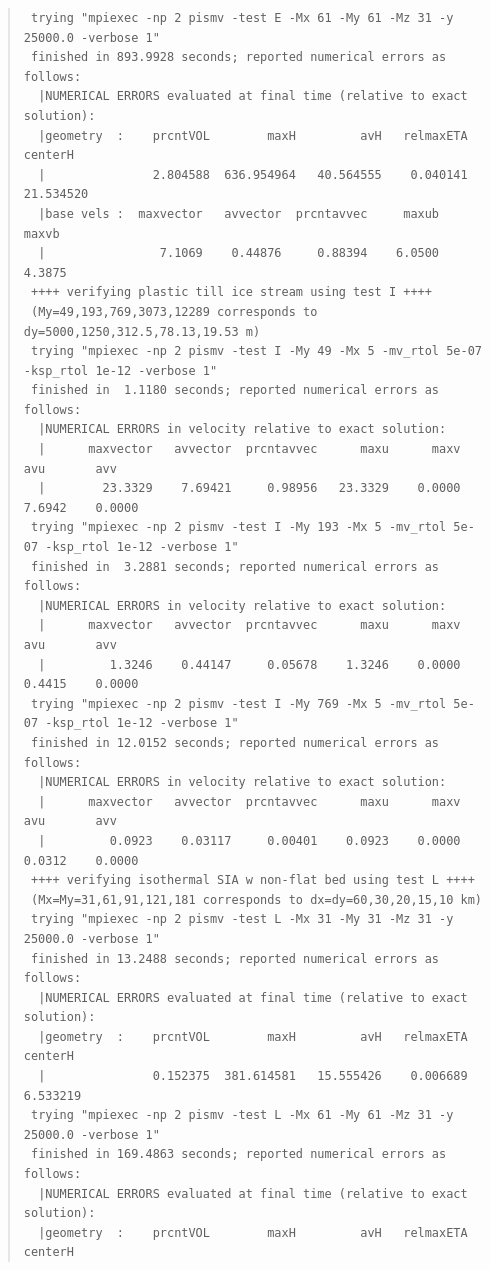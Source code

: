 \documentclass[11pt,final]{amsart}
\begin{document}
\begin{quote}
\begin{verbatim}
 trying "mpiexec -np 2 pismv -test E -Mx 61 -My 61 -Mz 31 -y 25000.0 -verbose 1"
 finished in 893.9928 seconds; reported numerical errors as follows:
  |NUMERICAL ERRORS evaluated at final time (relative to exact solution):
  |geometry  :    prcntVOL        maxH         avH   relmaxETA      centerH
  |               2.804588  636.954964   40.564555    0.040141    21.534520
  |base vels :  maxvector   avvector  prcntavvec     maxub     maxvb
  |                7.1069    0.44876     0.88394    6.0500    4.3875
 ++++ verifying plastic till ice stream using test I ++++
 (My=49,193,769,3073,12289 corresponds to dy=5000,1250,312.5,78.13,19.53 m)
 trying "mpiexec -np 2 pismv -test I -My 49 -Mx 5 -mv_rtol 5e-07 -ksp_rtol 1e-12 -verbose 1"
 finished in  1.1180 seconds; reported numerical errors as follows:
  |NUMERICAL ERRORS in velocity relative to exact solution:
  |      maxvector   avvector  prcntavvec      maxu      maxv       avu       avv
  |        23.3329    7.69421     0.98956   23.3329    0.0000    7.6942    0.0000
 trying "mpiexec -np 2 pismv -test I -My 193 -Mx 5 -mv_rtol 5e-07 -ksp_rtol 1e-12 -verbose 1"
 finished in  3.2881 seconds; reported numerical errors as follows:
  |NUMERICAL ERRORS in velocity relative to exact solution:
  |      maxvector   avvector  prcntavvec      maxu      maxv       avu       avv
  |         1.3246    0.44147     0.05678    1.3246    0.0000    0.4415    0.0000
 trying "mpiexec -np 2 pismv -test I -My 769 -Mx 5 -mv_rtol 5e-07 -ksp_rtol 1e-12 -verbose 1"
 finished in 12.0152 seconds; reported numerical errors as follows:
  |NUMERICAL ERRORS in velocity relative to exact solution:
  |      maxvector   avvector  prcntavvec      maxu      maxv       avu       avv
  |         0.0923    0.03117     0.00401    0.0923    0.0000    0.0312    0.0000
 ++++ verifying isothermal SIA w non-flat bed using test L ++++
 (Mx=My=31,61,91,121,181 corresponds to dx=dy=60,30,20,15,10 km)
 trying "mpiexec -np 2 pismv -test L -Mx 31 -My 31 -Mz 31 -y 25000.0 -verbose 1"
 finished in 13.2488 seconds; reported numerical errors as follows:
  |NUMERICAL ERRORS evaluated at final time (relative to exact solution):
  |geometry  :    prcntVOL        maxH         avH   relmaxETA      centerH
  |               0.152375  381.614581   15.555426    0.006689     6.533219
 trying "mpiexec -np 2 pismv -test L -Mx 61 -My 61 -Mz 31 -y 25000.0 -verbose 1"
 finished in 169.4863 seconds; reported numerical errors as follows:
  |NUMERICAL ERRORS evaluated at final time (relative to exact solution):
  |geometry  :    prcntVOL        maxH         avH   relmaxETA      centerH

\end{verbatim}
\end{quote}
\end{document}

